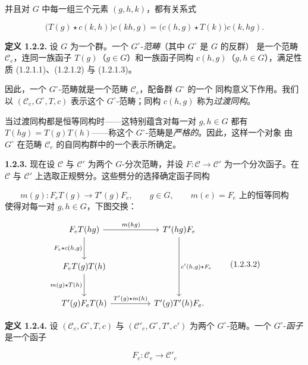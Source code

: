 \clearpage
{}%
并且对 $G$ 中每一组三个元素 $(g,h,k)$，都有关系式

\begin{equation}
  \bigl(T(g)\star c(k,h)\bigr)c(kh,g)
  =\bigl(c(h,g)\star T(k)\bigr)c(k,hg).
  \tag{1.2.1.3}
\end{equation}

\noindent\textbf{定义 1.2.2.}\quad
设 $G$ 为一个群。一个 $G^\circ$-\emph{范畴}（其中 $G^\circ$ 是 $G$ 的反群）
是一个范畴 $\mathcal C_e$，连同一族函子 $T(g)$（$g\in G$）和一族函子同构
$c(h,g)$（$g,h\in G$），满足性质 (1.2.1.1)、(1.2.1.2) 与 (1.2.1.3)。

因此，一个 $G^\circ$-范畴就是一个范畴 $\mathcal C_e$，配备群 $G^\circ$ 的一个
同构意义下作用。我们以 $(\mathcal C_e,G^\circ,T,c)$ 表示这个
$G^\circ$-范畴；同构 $c(h,g)$ 称为\emph{过渡同构}。

当过渡同构都是恒等同构时——这特别蕴含对每一对 $g,h\in G$ 都有
$T(hg)=T(g)T(h)$——称这个 $G^\circ$-范畴是\emph{严格的}。因此，这样一个对象
由 $G^\circ$ 在范畴 $\mathcal C_e$ 的自同构群中的一个表示所确定。

\noindent\textbf{1.2.3.}\quad
现在设 $\mathcal C$ 与 $\mathcal C'$ 为两个 $G$-分次范畴，并设
$F\colon\mathcal C\to\mathcal C'$ 为一个分次函子。在 $\mathcal C$ 与
$\mathcal C'$ 上选取正规劈分。这些劈分的选择确定函子同构

\begin{equation}
  m(g)\colon F_eT(g)\longrightarrow T'(g)F_e,\qquad
  g\in G,\qquad m(e)=\text{$F_e$ 上的恒等同构}
  \tag{1.2.3.1}
\end{equation}
使得对每一对 $g,h\in G$，下图交换：

\begin{equation}
\begin{tikzcd}[column sep=huge,row sep=large]
F_eT(hg)
  \arrow[r,"m(hg)"]
  \arrow[d,"{F_e\star c(h,g)}",swap]
&
T^{\prime}(hg)F_e
  \arrow[dd,"{c^{\prime}(h,g)\star F_e}"]
\\
F_eT(g)T(h)
  \arrow[d,"m(g)\star T(h)",swap]
&
{}
\\
T^{\prime}(g)F_eT(h)
  \arrow[r,"T^{\prime}(g)\star m(h)"]
&
T^{\prime}(g)T^{\prime}(h)F_e\mathpunct{.}
\end{tikzcd}
\tag{1.2.3.2}
\end{equation}

\noindent\textbf{定义 1.2.4.}\quad
设 $(\mathcal C_e,G^\circ,T,c)$ 与
$(\mathcal C'_e,G^\circ,T',c')$ 为两个 $G^\circ$-范畴。一个
$G^\circ$-\emph{函子}是一个函子

\[
  F_e\colon\mathcal C_e\longrightarrow\mathcal C'_e
\]
